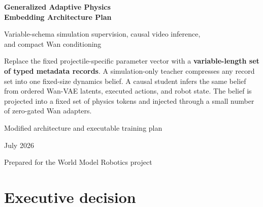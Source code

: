 \documentclass[11pt]{article}
\begin{document}

\begin{titlepage}
\centering
\vspace*{0.50in}
{\Huge\bfseries\color{navy} Generalized Adaptive Physics\\[0.10in]
Embedding Architecture Plan\par}
\vspace{0.24in}
{\Large Variable-schema simulation supervision, causal video inference,\\
and compact Wan conditioning\par}
\vspace{0.42in}

\begin{tcolorbox}[width=0.89\textwidth,colback=bluebox,colframe=navy,boxrule=1pt,arc=2mm]
\centering
\large
Replace the fixed projectile-specific parameter vector with a
\textbf{variable-length set of typed metadata records}.  A simulation-only
teacher compresses any record set into one fixed-size dynamics belief.  A
causal student infers the same belief from ordered Wan-VAE latents, executed
actions, and robot state.  The belief is projected into a fixed set of physics
tokens and injected through a small number of zero-gated Wan adapters.
\end{tcolorbox}

\vfill
{\large Modified architecture and executable training plan\par}
\vspace{0.12in}
{\large July 2026\par}
\vspace{0.35in}
{\small Prepared for the World Model Robotics project\par}
\end{titlepage}

\clearpage
{}
\tableofcontents
\clearpage
{}

\section{Executive decision}
\end{document}
